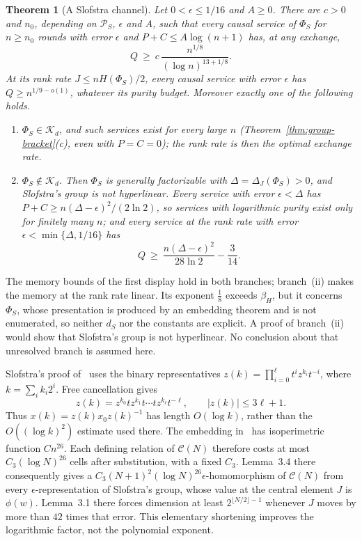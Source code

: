 \documentclass[11pt,a4paper]{article}
\theoremstyle{plain}
\newtheorem{theorem}{Theorem}[section]
\theoremstyle{definition}
\theoremstyle{remark}
\begin{document}
\begin{theorem}[A Slofstra channel]\label{thm:slofstra}
Let $0<\epsilon\le1/16$ and $A\ge0$. There are $c>0$ and $n_0$, depending on $\mathcal P_S$, $\epsilon$ and $A$, such that every causal service of $\Phi_S$ for $n\ge n_0$
rounds with error $\epsilon$ and $P+C\le A\log(n+1)$ has, at any exchange,
\[
Q\ \ge\ c\,\frac{n^{1/8}}{(\log n)^{13+1/8}} .
\]
At its rank rate $J\le nH(\Phi_S)/2$, every causal service with error $\epsilon$ has $Q\ge n^{1/9-o(1)}$, whatever its purity budget. Moreover
exactly one of the following holds.
\begin{enumerate}[label=(\roman*)]
\item $\Phi_S\in\mathcal K_d$, and such services exist for every large $n$ (Theorem~\ref{thm:group-bracket}(c), even with $P=C=0$); the rank rate is then the optimal
exchange rate.
\item $\Phi_S\notin\mathcal K_d$. Then $\Phi_S$ is generally factorizable with $\Delta=\Delta_J(\Phi_S)>0$, and Slofstra's group is not hyperlinear. Every
service with error $\epsilon<\Delta$ has $P+C\ge n(\Delta-\epsilon)^2/(2\ln2)$, so services with logarithmic purity exist only for finitely many $n$; and
every service at the rank rate with error $\epsilon<\min\{\Delta,1/16\}$ has
\[
Q\ \ge\ \frac{n(\Delta-\epsilon)^2}{28\ln2}-\frac3{14} .
\]
\end{enumerate}
\end{theorem}

The memory bounds of the first display hold in both branches; branch~(ii) makes the memory at the rank rate linear. Its exponent $\frac18$ exceeds $\beta_H$, but it
concerns $\Phi_S$, whose presentation is produced by an embedding theorem and is not enumerated, so neither $d_S$ nor the constants are
explicit. A proof of branch~(ii) would show that Slofstra's group is not hyperlinear. No conclusion about that unresolved branch is assumed here.


Slofstra's proof of~\cite[Theorem~1.2]{Slofstra2018} uses the binary representatives
$z(k)=\prod_{i=0}^{\ell}t^iz^{k_i}t^{-i}$, where $k=\sum_i k_i2^i$. Free cancellation gives
\[
z(k)=z^{k_0}t z^{k_1}t\cdots t z^{k_\ell}t^{-\ell},
\qquad |z(k)|\le3\ell+1.
\]
Thus $x(k)=z(k)x_0z(k)^{-1}$ has length $O(\log k)$, rather than the $O((\log k)^2)$ estimate used there.
The embedding in~\cite[Corollary~2.4]{Slofstra2018} has isoperimetric function $Cn^{26}$.
Each defining relation of $\mathcal C(N)$ therefore costs at most $C_3(\log N)^{26}$ cells after substitution, with a fixed $C_3$.
Lemma~3.4 there consequently gives a $C_3(N+1)^2(\log N)^{26}\epsilon$-homomorphism of $\mathcal C(N)$ from every
$\epsilon$-representation of Slofstra's group, whose value at the central element $J$ is $\phi(w)$.
Lemma~3.1 there forces dimension at least $2^{\lfloor N/2\rfloor-1}$ whenever $J$ moves by more than $42$ times that error.
This elementary shortening improves the logarithmic factor, not the polynomial exponent.
\end{document}
